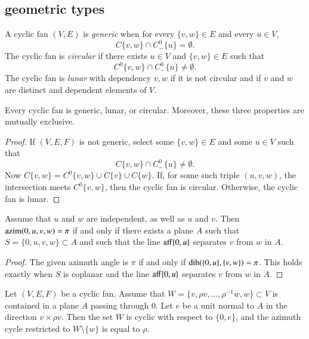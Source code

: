 \subsection{geometric types}

\begin{definition}
A cyclic fan $(V,E)$ is {\it generic} when for every $\{v,w\}\in E$
and every $u\in V$, 
$$
C\{v,w\}\cap C^0_-\{u\} = \emptyset.
$$
The cyclic fan is {\it circular} if there exists $u\in V$ and $\{v,w\}\in E$ such that 
$$
C^0\{v,w\}\cap C^0_-\{u\}\ne \emptyset.
$$
The cyclic fan is {\it lunar} with dependency $v,w$ if it is not circular and if $v$ and $w$ are distinct and dependent elements of $V$.
\end{definition}

\begin{lemma} Every cyclic fan is
generic, lunar, or circular.  Moreover, these three properties are mutually exclusive.
\end{lemma}

\begin{proof} If $(V,E,F)$ is not generic,  select some $\{v,w\}\in E$
and some $u\in V$ such that
$$
C\{v,w\}\cap C^0_-\{u\} \ne \emptyset.
$$
Now $C\{v,w\} = C^0\{v,w\} \cup C\{v\}\cup C\{w\}$.  
If, for some such triple $(u,v,w)$, the intersection meets $C^0\{v,w\}$, then the cyclic fan is circular.  
Otherwise, the cyclic fan is lunar. 
\end{proof}

\begin{lemma}  \label{lemma:coplanar}
Assume that $u$ and $w$ are independent, as well as $u$ and $v$.  Then ${\operatorname{azim}}(0,u,v,w)=\pi$
if and only if there exists a plane $A$ such that
$S=\{0,u,v,w\}\subset A$ and such that the line ${\operatorname{aff}}\{0,u\}$ separates $v$ from $w$ in $A$.
\end{lemma}

\begin{proof}  The given azimuth angle is $\pi$ if and only if $\operatorname{dih}(\{0,u\},\{v,w\})=\pi$.  This holds
exactly when $S$ is coplanar and the line ${\operatorname{aff}}\{0,u\}$ separates $v$ from $w$ in $A$.
\end{proof}

\begin{lemma}
Let $(V,E,F)$ be a cyclic fan.  Assume that $W=\{v,\rho v,\ldots,\rho^{-1}w,w\}\subset V$ is contained in a plane $A$ passing through $0$.  Let $e$ be a unit normal to $A$ in the direction $v\times \rho v$.  Then 
the set $W$ is cyclic with respect to $\{0,e\}$, and the azimuth cycle restricted to $W\setminus \{w\}$ is equal to $\rho$.
\end{lemma}

